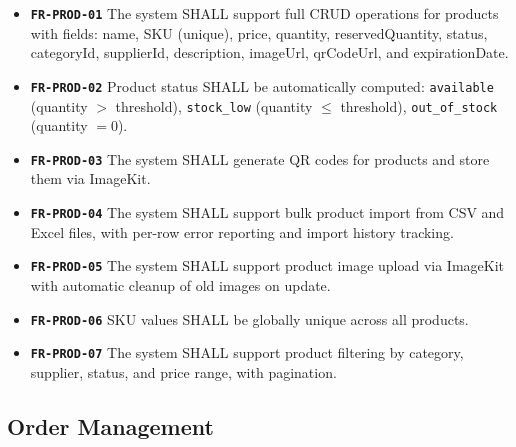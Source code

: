 ﻿\documentclass[12pt,a4paper]{report}
\newcommand{\req}[1]{\texttt{\textbf{\color{primary}#1}}}
\begin{document}
\begin{tcolorbox}[reqbox,title={FR-PROD: Product Requirements}]
\begin{itemize}[leftmargin=1.5em]
  \item \req{FR-PROD-01} The system SHALL support full CRUD operations for products with fields: name, SKU (unique), price, quantity, reservedQuantity, status, categoryId, supplierId, description, imageUrl, qrCodeUrl, and expirationDate.
  \item \req{FR-PROD-02} Product status SHALL be automatically computed: \texttt{available} (quantity $>$ threshold), \texttt{stock\_low} (quantity $\leq$ threshold), \texttt{out\_of\_stock} (quantity $= 0$).
  \item \req{FR-PROD-03} The system SHALL generate QR codes for products and store them via ImageKit.
  \item \req{FR-PROD-04} The system SHALL support bulk product import from CSV and Excel files, with per-row error reporting and import history tracking.
  \item \req{FR-PROD-05} The system SHALL support product image upload via ImageKit with automatic cleanup of old images on update.
  \item \req{FR-PROD-06} SKU values SHALL be globally unique across all products.
  \item \req{FR-PROD-07} The system SHALL support product filtering by category, supplier, status, and price range, with pagination.
\end{itemize}
\end{tcolorbox}

\subsection{Order Management}
\end{document}
